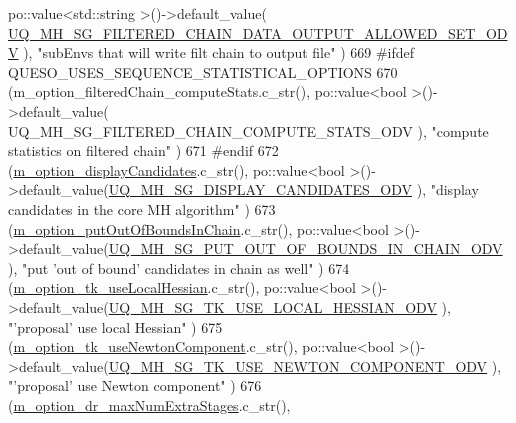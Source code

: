 \begin{DoxyCode}
        po::value<std::string >()->default\_value(
      \hyperlink{_metropolis_hastings_s_g_options_8h_afe6ab4fa79b1e65d196f3d0964edf829}{UQ\_MH\_SG\_FILTERED\_CHAIN\_DATA\_OUTPUT\_ALLOWED\_SET\_ODV}     
           ), \textcolor{stringliteral}{"subEnvs that will write filt chain to output file"}          )
669 #ifdef QUESO\_USES\_SEQUENCE\_STATISTICAL\_OPTIONS
670     (m\_option\_filteredChain\_computeStats.c\_str(),                 po::value<bool        >()->default\_value(
      UQ\_MH\_SG\_FILTERED\_CHAIN\_COMPUTE\_STATS\_ODV                    ), \textcolor{stringliteral}{"compute statistics on filtered chain"}      
                       )
671 #endif
672     (\hyperlink{class_q_u_e_s_o_1_1_metropolis_hastings_s_g_options_a7881fafcf3caa7bf33d20ff0a7576944}{m\_option\_displayCandidates}.c\_str(),                          po::value<bool 
             >()->default\_value(\hyperlink{_metropolis_hastings_s_g_options_8h_afd9de97e637ad6bce8c4829f3c9567e9}{UQ\_MH\_SG\_DISPLAY\_CANDIDATES\_ODV}                    
                ), \textcolor{stringliteral}{"display candidates in the core MH algorithm"}                )
673     (\hyperlink{class_q_u_e_s_o_1_1_metropolis_hastings_s_g_options_a6d1856b0435c6dfcac6b75ec36829b47}{m\_option\_putOutOfBoundsInChain}.c\_str(),                      
      po::value<bool        >()->default\_value(\hyperlink{_metropolis_hastings_s_g_options_8h_acfa03e1487c443ca6e3cb2f1edee5c5e}{UQ\_MH\_SG\_PUT\_OUT\_OF\_BOUNDS\_IN\_CHAIN\_ODV}
                            ), \textcolor{stringliteral}{"put 'out of bound' candidates in chain as well"}             )
674     (\hyperlink{class_q_u_e_s_o_1_1_metropolis_hastings_s_g_options_a8b184b15ebded02f00668b1d0f761a2d}{m\_option\_tk\_useLocalHessian}.c\_str(),                         po::value<bool
              >()->default\_value(\hyperlink{_metropolis_hastings_s_g_options_8h_a1f8c00c4abc85b13ac99aa8589ddb63b}{UQ\_MH\_SG\_TK\_USE\_LOCAL\_HESSIAN\_ODV}               
                   ), \textcolor{stringliteral}{"'proposal' use local Hessian"}                               )
675     (\hyperlink{class_q_u_e_s_o_1_1_metropolis_hastings_s_g_options_af732a2bed220e834c03802de602025fa}{m\_option\_tk\_useNewtonComponent}.c\_str(),                      
      po::value<bool        >()->default\_value(\hyperlink{_metropolis_hastings_s_g_options_8h_a53227a25ea286a43bf1079990e6660a6}{UQ\_MH\_SG\_TK\_USE\_NEWTON\_COMPONENT\_ODV}      
                         ), \textcolor{stringliteral}{"'proposal' use Newton component"}                            )
676     (\hyperlink{class_q_u_e_s_o_1_1_metropolis_hastings_s_g_options_a8975cf2f3431edb501ccc94f0c65b2c3}{m\_option\_dr\_maxNumExtraStages}.c\_str(),                       

\end{DoxyCode}
